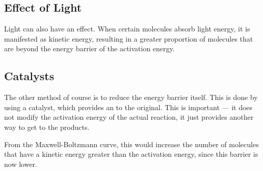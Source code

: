 

		\subsection{Effect of Light}

			Light can also have an effect. When certain molecules absorb light energy, it is manifested as kinetic energy, resulting in a
			greater proportion of molecules that are beyond the energy barrier of the activation energy.




		\pagebreak
		\subsection{Catalysts}

			The other method of course is to reduce the energy barrier itself. This is done by using a catalyst, which provides an
			 to the original. This is important --- it does not modify the activation energy of the actual
			reaction, it just provides another way to get to the products.

			From the Maxwell-Boltzmann curve, this would increase the number of molecules that have a kinetic energy greater
			than the activation energy, since this barrier is now lower.

